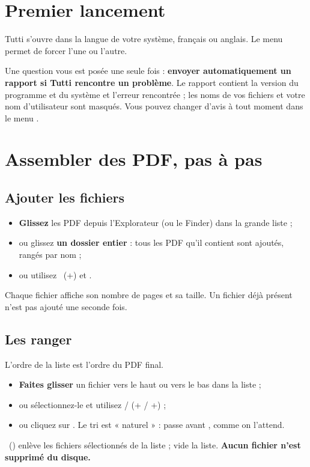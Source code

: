 \section{Premier lancement}

Tutti s'ouvre dans la langue de votre système, français ou anglais. Le menu 
permet de forcer l'une ou l'autre.

Une question vous est posée une seule fois : \textbf{envoyer automatiquement un rapport si
Tutti rencontre un problème}. Le rapport contient la version du programme et du système et
l'erreur rencontrée ; les noms de vos fichiers et votre nom d'utilisateur sont masqués.
Vous pouvez changer d'avis à tout moment dans le menu .


\section{Assembler des PDF, pas à pas}\label{sec:assembler}

\subsection{Ajouter les fichiers}
\begin{itemize}
\item \textbf{Glissez} les PDF depuis l'Explorateur (ou le Finder) dans la grande liste ;
\item ou glissez \textbf{un dossier entier} : tous les PDF qu'il contient sont ajoutés, rangés par nom ;
\item ou utilisez  \ (+) et .
\end{itemize}
Chaque fichier affiche son nombre de pages et sa taille. Un fichier déjà présent n'est pas ajouté
une seconde fois.

\subsection{Les ranger}
L'ordre de la liste est l'ordre du PDF final.
\begin{itemize}
\item \textbf{Faites glisser} un fichier vers le haut ou vers le bas dans la liste ;
\item ou sélectionnez-le et utilisez  / 
      (+ / +) ;
\item ou cliquez sur . Le tri est « naturel » :  passe avant
      , comme on l'attend.
\end{itemize}
 \ () enlève les fichiers sélectionnés de la liste ;
 vide la liste. \textbf{Aucun fichier n'est supprimé du disque.}

